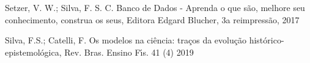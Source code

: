 \documentclass[
12pt,		%
openright,	%
twoside,  %
a4paper,			%
chapter=TITLE,		%
english,			%
french,				%
spanish,			%
brazil				%
]{USPSC-classe/USPSC}
\begin{document}
\begin{flushleft}
\begin{flushleft}
\begin{flushleft}
\begin{flushleft}
\begin{flushleft}
\begin{flushleft}
\begin{flushleft}
\begin{flushleft}
\begin{flushleft}
 Setzer, V. W.; Silva, F. S. C. Banco de Dados - Aprenda o que s\~ao, melhore seu conhecimento, construa os seus, Editora Edgard Blucher, 3a reimpress\~ao, 2017
\end{flushleft}


\end{flushleft}


\end{flushleft}


\end{flushleft}


\end{flushleft}


\end{flushleft}


\end{flushleft}


\end{flushleft}


\end{flushleft}


\begin{flushleft}
\begin{flushleft}
\begin{flushleft}
\begin{flushleft}
\begin{flushleft}
\begin{flushleft}
\begin{flushleft}
\begin{flushleft}
\begin{flushleft}
 Silva, F.S.; Catelli, F. Os modelos na ci\^encia: tra\c{c}os da evolu\c{c}\~ao hist\'orico-epistemol\'ogica,  Rev. Bras. Ensino F\'{\i}s. 41 (4) 2019
\end{flushleft}


\end{flushleft}


\end{flushleft}


\end{flushleft}


\end{flushleft}


\end{flushleft}


\end{flushleft}


\end{flushleft}


\end{flushleft}
\end{document}
